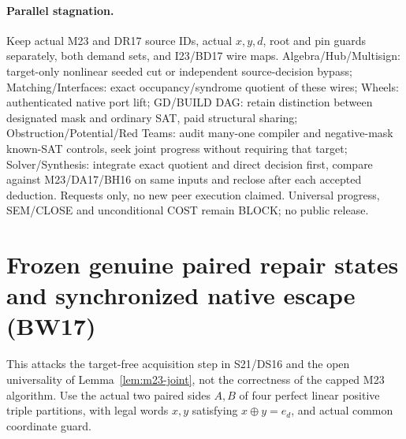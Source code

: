 \documentclass[11pt]{article}
\begin{document}
\paragraph{Parallel stagnation.}
Keep actual M23 and DR17 source IDs, actual $x,y,d$, root and pin guards separately, both demand sets, and I23/BD17 wire maps. Algebra/Hub/Multisign: target-only nonlinear seeded cut or independent source-decision bypass; Matching/Interfaces: exact occupancy/syndrome quotient of these wires; Wheels: authenticated native port lift; GD/BUILD DAG: retain distinction between designated mask and ordinary SAT, paid structural sharing; Obstruction/Potential/Red Teams: audit many-one compiler and negative-mask known-SAT controls, seek joint progress without requiring that target; Solver/Synthesis: integrate exact quotient and direct decision first, compare against M23/DA17/BH16 on same inputs and reclose after each accepted deduction. Requests only, no new peer execution claimed. Universal progress, SEM/CLOSE and unconditional COST remain BLOCK; no public release.


\section{Frozen genuine paired repair states and synchronized native escape (BW17)}\label{sec:bw17}
This attacks the target-free acquisition step in S21/DS16 and the open universality of Lemma~\ref{lem:m23-joint}, not the correctness of the capped M23 algorithm. Use the actual two paired sides $A,B$ of four perfect linear positive triple partitions, with legal words $x,y$ satisfying $x\oplus y=e_d$, and actual common coordinate guard.
\end{document}
